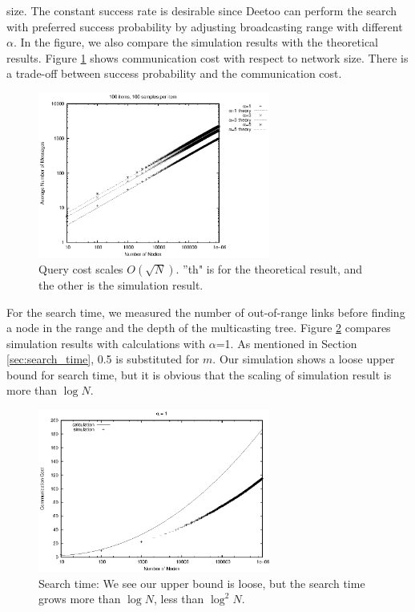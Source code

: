 \documentclass[conference]{IEEEtran}
\begin{document}
size.
The constant success rate is desirable since 
Deetoo can perform the search with preferred success probability by adjusting 
broadcasting range with different $\alpha$.  
In the figure, we also compare the simulation results with the theoretical results.
%
Figure \ref{fig:cost} shows communication cost with respect to network size. There is 
a trade-off between success probability and the communication cost. 
\begin{figure}
\centering
\includegraphics[width=3in]{th_hops_loglog1}
\caption{Query cost scales $O(\sqrt N)$. ''th" is for the theoretical result, 
and the other is the simulation result.} \label{fig:cost}
\end{figure}

For the search time, we measured the number of out-of-range links before finding 
a node in the range and the depth of the multicasting tree. 
Figure \ref{fig:time} %
compares simulation results with calculations with $\alpha$=1. 
As mentioned in Section \ref{sec:search_time}, 0.5 is substituted for $m$. 
Our simulation shows a loose upper bound for search time, 
but it is obvious that the scaling of simulation result is more than 
$\log N$.
\begin{figure}
\centering
\includegraphics[width=3in]{time1}
\caption{Search time: We see our upper bound is loose, but the search time grows 
more than $\log N$, less than $\log^2 N$.} \label{fig:time}
\end{figure}
\end{document}
